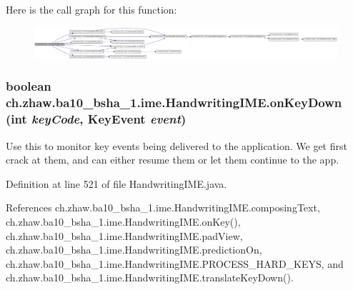 Here is the call graph for this function:\nopagebreak
\begin{figure}[H]
\begin{center}
\leavevmode
\includegraphics[width=420pt]{classch_1_1zhaw_1_1ba10__bsha__1_1_1ime_1_1HandwritingIME_a6bf7a6751794c5bf24f686cbf94d7ebf_cgraph}
\end{center}
\end{figure}
\hypertarget{classch_1_1zhaw_1_1ba10__bsha__1_1_1ime_1_1HandwritingIME_a999c8827bbffc0388be05c9e87e2ac49}{
\subsubsection[{onKeyDown}]{\setlength{\rightskip}{0pt plus 5cm}boolean ch.zhaw.ba10\_\-bsha\_\-1.ime.HandwritingIME.onKeyDown (int {\em keyCode}, \/  KeyEvent {\em event})}}
\label{classch_1_1zhaw_1_1ba10__bsha__1_1_1ime_1_1HandwritingIME_a999c8827bbffc0388be05c9e87e2ac49}
Use this to monitor key events being delivered to the application. We get first crack at them, and can either resume them or let them continue to the app. 

Definition at line 521 of file HandwritingIME.java.

References ch.zhaw.ba10\_\-bsha\_\-1.ime.HandwritingIME.composingText, ch.zhaw.ba10\_\-bsha\_\-1.ime.HandwritingIME.onKey(), ch.zhaw.ba10\_\-bsha\_\-1.ime.HandwritingIME.padView, ch.zhaw.ba10\_\-bsha\_\-1.ime.HandwritingIME.predictionOn, ch.zhaw.ba10\_\-bsha\_\-1.ime.HandwritingIME.PROCESS\_\-HARD\_\-KEYS, and ch.zhaw.ba10\_\-bsha\_\-1.ime.HandwritingIME.translateKeyDown().

